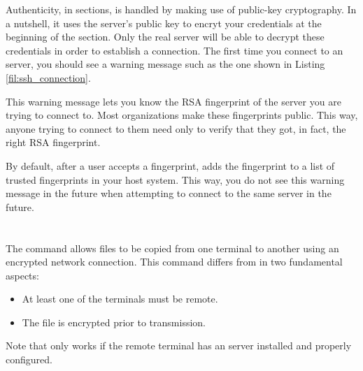 Authenticity, in  sections, is handled by making use of public-key cryptography. In a nutshell, it uses the server's public key to encryt your credentials at the beginning of the section. Only the real server will be able to decrypt these credentials in order to establish a connection. The first time you connect to an  server, you should see a warning message such as the one shown in Listing \ref{fil:ssh_connection}.


This warning message lets you know the RSA fingerprint of the  server you are trying to connect to. Most organizations make these fingerprints public. This way, anyone trying to connect to them need only to verify that they got, in fact, the right RSA fingerprint. 

By default, after a user accepts a fingerprint,  adds the fingerprint to a list of trusted fingerprints in your host system. This way, you do not see this warning message in the future when attempting to connect to the same  server in the future.

\section{}

The  command allows files to be copied from one terminal to another using an encrypted network connection. This command differs from  in two fundamental aspects:
\begin{itemize} 
\item At least one of the terminals must be remote.
\item The file is encrypted prior to transmission. 
\end{itemize}
Note that  only works if the remote terminal has an  server installed and properly configured.


